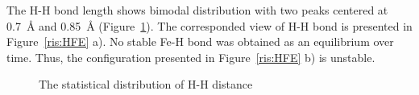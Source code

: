 \newpage
The H-H bond length shows bimodal distribution with two peaks centered at 0.7~{\AA} and 0.85~{\AA} (Figure~\ref{ris:HHstatis}). 
The corresponded view of H-H bond is presented in Figure~\ref{ris:HFE} a). 
No stable Fe-H bond was obtained as an equilibrium over time. Thus, the configuration presented in Figure~\ref{ris:HFE} b) is unstable.

\begin{figure}[h!]
\caption{The statistical distribution of H-H distance}
\label{ris:HHstatis}
\end{figure}


